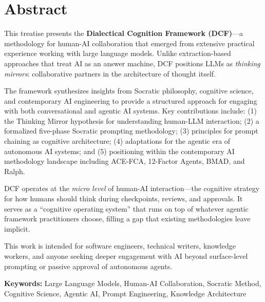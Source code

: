 \chapter*{Abstract}

This treatise presents the \textbf{Dialectical Cognition Framework (DCF)}---a methodology for human-AI collaboration that emerged from extensive practical experience working with large language models. Unlike extraction-based approaches that treat AI as an answer machine, DCF positions LLMs as \emph{thinking mirrors}: collaborative partners in the architecture of thought itself.

The framework synthesizes insights from Socratic philosophy, cognitive science, and contemporary AI engineering to provide a structured approach for engaging with both conversational and agentic AI systems. Key contributions include: (1) the Thinking Mirror hypothesis for understanding human-LLM interaction; (2) a formalized five-phase Socratic prompting methodology; (3) principles for prompt chaining as cognitive architecture; (4) adaptations for the agentic era of autonomous AI systems; and (5) positioning within the contemporary AI methodology landscape including ACE-FCA, 12-Factor Agents, BMAD, and Ralph.

DCF operates at the \emph{micro level} of human-AI interaction---the cognitive strategy for how humans should think during checkpoints, reviews, and approvals. It serves as a ``cognitive operating system'' that runs on top of whatever agentic framework practitioners choose, filling a gap that existing methodologies leave implicit.

This work is intended for software engineers, technical writers, knowledge workers, and anyone seeking deeper engagement with AI beyond surface-level prompting or passive approval of autonomous agents.

\vspace{1cm}
\noindent\textbf{Keywords:} Large Language Models, Human-AI Collaboration, Socratic Method, Cognitive Science, Agentic AI, Prompt Engineering, Knowledge Architecture
